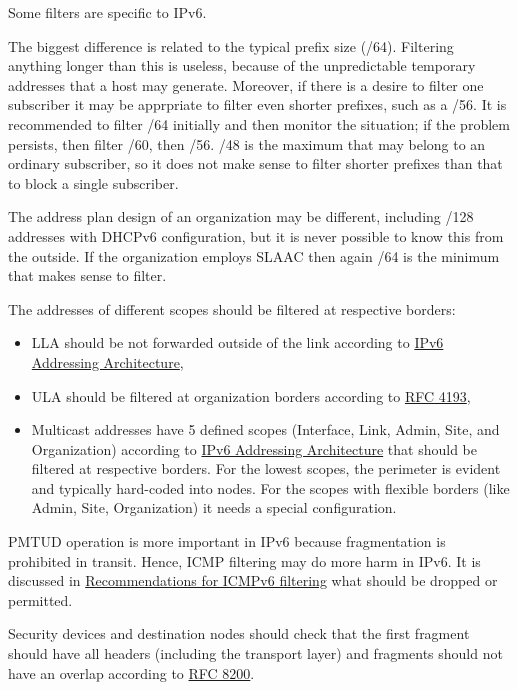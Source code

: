 \documentclass[
]{article}
\providecommand{\tightlist}{%
  \setlength{\itemsep}{0pt}\setlength{\parskip}{0pt}}
\begin{document}
Some filters are specific to IPv6.

The biggest difference is related to the typical prefix size (/64).
Filtering anything longer than this is useless, because of the
unpredictable temporary addresses that a host may generate. Moreover, if
there is a desire to filter one subscriber it may be apprpriate to
filter even shorter prefixes, such as a /56. It is recommended to filter
/64 initially and then monitor the situation; if the problem persists,
then filter /60, then /56. /48 is the maximum that may belong to an
ordinary subscriber, so it does not make sense to filter shorter
prefixes than that to block a single subscriber.

The address plan design of an organization may be different, including
/128 addresses with DHCPv6 configuration, but it is never possible to
know this from the outside. If the organization employs SLAAC then again
/64 is the minimum that makes sense to filter.

The addresses of different scopes should be filtered at respective
borders:

\begin{itemize}
\tightlist
\item
  LLA should be not forwarded outside of the link according to
  \href{https://www.rfc-editor.org/info/rfc4291}{IPv6 Addressing
  Architecture},
\item
  ULA should be filtered at organization borders according to
  \href{https://www.rfc-editor.org/info/rfc4193}{RFC 4193},
\item
  Multicast addresses have 5 defined scopes (Interface, Link, Admin,
  Site, and Organization) according to
  \href{https://www.rfc-editor.org/info/rfc4291}{IPv6 Addressing
  Architecture} that should be filtered at respective borders. For the
  lowest scopes, the perimeter is evident and typically hard-coded into
  nodes. For the scopes with flexible borders (like Admin, Site,
  Organization) it needs a special configuration.
\end{itemize}

PMTUD operation is more important in IPv6 because fragmentation is
prohibited in transit. Hence, ICMP filtering may do more harm in IPv6.
It is discussed in
\href{https://www.rfc-editor.org/info/rfc4890}{Recommendations for
ICMPv6 filtering} what should be dropped or permitted.

Security devices and destination nodes should check that the first
fragment should have all headers (including the transport layer) and
fragments should not have an overlap according to
\href{https://www.rfc-editor.org/info/rfc8200}{RFC 8200}.
\end{document}

